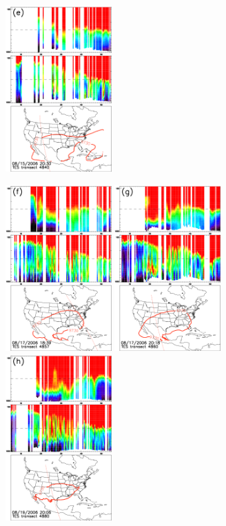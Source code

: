 \begin{figure}
\begin{center}
		\includegraphics[width=1.6in]{o3/o3_4840_ftuv}
		
		\includegraphics[width=1.6in]{o3/o3_4857_ftuv}
		\includegraphics[width=1.6in]{o3/o3_4860_ftuv}
		\includegraphics[width=1.6in]{o3/o3_4880_ftuv}

\end{center}
\end{figure}
